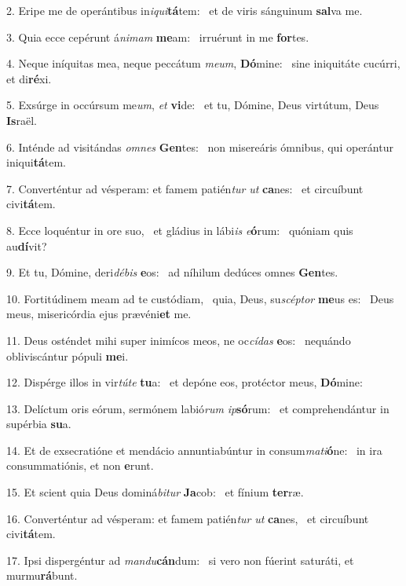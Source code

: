 2. Eripe me de operántibus in\textit{i}\textit{qui}\textbf{tá}tem: \ast\  et de viris sánguinum \textbf{sal}va me.\

3. Quia ecce cepérunt á\textit{ni}\textit{mam} \textbf{me}am: \ast\  irruérunt in me \textbf{for}tes.\

4. Neque iníquitas mea, neque peccátum \textit{me}\textit{um}, \textbf{Dó}mine: \ast\  sine iniquitáte cucúrri, et di\textbf{ré}xi.\

5. Exsúrge in occúrsum me\textit{um}, \textit{et} \textbf{vi}de: \ast\  et tu, Dómine, Deus virtútum, Deus \textbf{Is}raël.\

6. Inténde ad visitándas \textit{om}\textit{nes} \textbf{Gen}tes: \ast\  non misereáris ómnibus, qui operántur iniqui\textbf{tá}tem.\

7. Converténtur ad vésperam: et famem patién\textit{tur} \textit{ut} \textbf{ca}nes: \ast\  et circuíbunt civi\textbf{tá}tem.\

8. Ecce loquéntur in ore suo, \dag\  et gládius in lábi\textit{is} \textit{e}\textbf{ó}rum: \ast\  quóniam quis au\textbf{dí}vit?\

9. Et tu, Dómine, deri\textit{dé}\textit{bis} \textbf{e}os: \ast\  ad níhilum dedúces omnes \textbf{Gen}tes.\

10. Fortitúdinem meam ad te custódiam, \dag\  quia, Deus, su\textit{scép}\textit{tor} \textbf{me}us es: \ast\  Deus meus, misericórdia ejus prævéni\textbf{et} me.\

11. Deus osténdet mihi super inimícos meos, ne oc\textit{cí}\textit{das} \textbf{e}os: \ast\  nequándo obliviscántur pópuli \textbf{me}i.\

12. Dispérge illos in vir\textit{tú}\textit{te} \textbf{tu}a: \ast\  et depóne eos, protéctor meus, \textbf{Dó}mine:\

13. Delíctum oris eórum, sermónem labió\textit{rum} \textit{ip}\textbf{só}rum: \ast\  et comprehendántur in supérbia \textbf{su}a.\

14. Et de exsecratióne et mendácio annuntiabúntur in consum\textit{ma}\textit{ti}\textbf{ó}ne: \ast\  in ira consummatiónis, et non \textbf{e}runt.\

15. Et scient quia Deus dominá\textit{bi}\textit{tur} \textbf{Ja}cob: \ast\  et fínium \textbf{ter}ræ.\

16. Converténtur ad vésperam: et famem patién\textit{tur} \textit{ut} \textbf{ca}nes, \ast\  et circuíbunt civi\textbf{tá}tem.\

17. Ipsi dispergéntur ad \textit{man}\textit{du}\textbf{cán}dum: \ast\  si vero non fúerint saturáti, et murmu\textbf{rá}bunt.\

